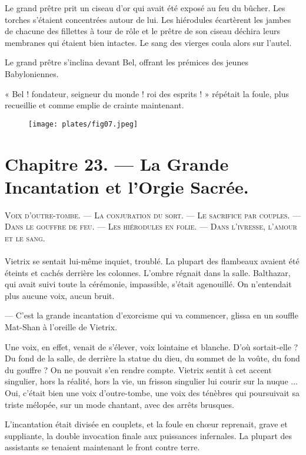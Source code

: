 \documentclass[a4paper, 11pt, oneside, polutonikogreek, french]{article}
\begin{document}
Le grand prêtre prit un ciseau d'or qui avait été exposé au feu du bûcher. Les torches s'étaient concentrées autour de lui. Les hiérodules écartèrent les jambes de chacune des fillettes à tour de rôle et le prêtre de son ciseau déchira leurs membranes qui étaient bien intactes. Le sang des vierges coula alors sur l'autel.

Le grand prêtre s'inclina devant Bel, offrant les prémices des jeunes Babyloniennes.

« Bel ! fondateur, seigneur du monde ! roi des esprits ! » répétait la foule, plus recueillie et comme emplie de crainte maintenant.
\clearpage
\begin{figure}[H]
\centering
\texttt{[image: plates/fig07.jpeg]}
\end{figure}
\section{Chapitre 23. --- La Grande Incantation et l'Orgie Sacrée.}
\begin{center}
\scshape
\small
Voix d'outre-tombe. --- La conjuration du sort. --- Le sacrifice par couples. --- Dans le gouffre de feu. --- Les hiérodules en folie. --- Dans l'ivresse, l'amour et le sang.
\end{center}
\paragraph{}
Vietrix se sentait lui-même inquiet, troublé. La plupart des flambeaux avaient été éteints et cachés derrière les colonnes. L'ombre régnait dans la salle. Balthazar, qui avait suivi toute la cérémonie, impassible, s'était agenouillé. On n'entendait plus aucune voix, aucun bruit.

--- C'est la grande incantation d'exorcisme qui va commencer, glissa en un souffle Mat-Shan à l'oreille de Vietrix.

Une voix, en effet, venait de s'élever, voix lointaine et blanche. D'où sortait-elle ? Du fond de la salle, de derrière la statue du dieu, du sommet de la voûte, du fond du gouffre ? On ne pouvait s'en rendre compte. Vietrix sentit à cet accent singulier, hors la réalité, hors la vie, un frisson singulier lui courir sur la nuque ... Oui, c'était bien une voix d'outre-tombe, une voix des ténèbres qui poursuivait sa triste mélopée, sur un mode chantant, avec des arrêts brusques.

L'incantation était divisée en couplets, et la foule en chœur reprenait, grave et suppliante, la double invocation finale aux puissances infernales. La plupart des assistants se tenaient maintenant le front contre terre.
\end{document}
